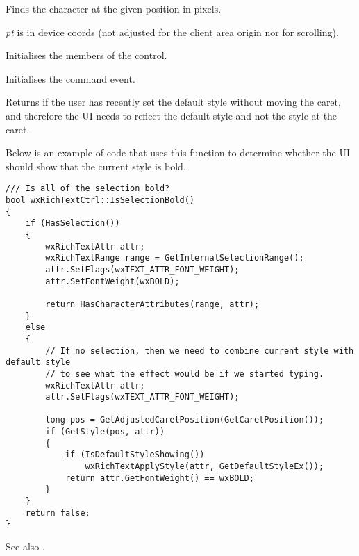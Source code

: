 Finds the character at the given position in pixels.

{\it pt} is in device coords (not adjusted for the client area origin nor for scrolling).

\label{wxrichtextctrlinit}


Initialises the members of the control.

\label{wxrichtextctrlinitcommandevent}


Initialises the command event.

\label{wxrichtextctrlisdefaultstyleshowing}


Returns \true if the user has recently set the default style without moving the caret,
and therefore the UI needs to reflect the default style and not the style at the caret.

Below is an example of code that uses this function to determine whether the UI
should show that the current style is bold.

\begin{verbatim}
/// Is all of the selection bold?
bool wxRichTextCtrl::IsSelectionBold()
{
    if (HasSelection())
    {
        wxRichTextAttr attr;
        wxRichTextRange range = GetInternalSelectionRange();
        attr.SetFlags(wxTEXT_ATTR_FONT_WEIGHT);
        attr.SetFontWeight(wxBOLD);

        return HasCharacterAttributes(range, attr);
    }
    else
    {
        // If no selection, then we need to combine current style with default style
        // to see what the effect would be if we started typing.
        wxRichTextAttr attr;
        attr.SetFlags(wxTEXT_ATTR_FONT_WEIGHT);

        long pos = GetAdjustedCaretPosition(GetCaretPosition());
        if (GetStyle(pos, attr))
        {
            if (IsDefaultStyleShowing())
                wxRichTextApplyStyle(attr, GetDefaultStyleEx());
            return attr.GetFontWeight() == wxBOLD;
        }
    }
    return false;
}
\end{verbatim}

See also .

